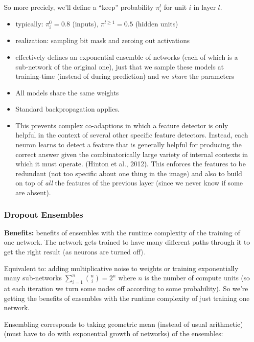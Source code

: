 \documentclass[a2paper,4pt]{extarticle}
\begin{document}
\begin{landscape}
\begin{multicols*}{7}
So more preciely, we'll define a ``keep'' probability $\pi_i^l$ for unit $i$ in
layer $l$.
\begin{itemize}
  \item typically: $\pi_i^0=0.8$ (inputs), $\pi^{l\geq 1}=0.5$ (hidden units)
  \item realization: sampling bit mask and zeroing out activations
  \item effectively defines an exponential ensemble of networks (each of which
  is a sub-network of the original one), just that we sample these models at
  training-time (instead of during prediction) and we \emph{share} the
  parameters
  \item All models share the same weights
  \item Standard backpropagation applies.
  \item This prevents complex co-adaptions in which a feature detector is only
helpful in the context of several other specific feature detectors. Instead,
each neuron learns to detect a feature that is generally helpful for producing
the correct answer given the combinatorically large variety of internal contexts
in which it must operate. (Hinton et al., 2012). This enforces the features to be redundant (not too specific about one thing in
the image) and also to build on top of \emph{all} the features of the previous
layer (since we never know if some are absent).
\end{itemize}

\subsubsection{Dropout Ensembles}

\textbf{Benefits:} benefits of ensembles with the runtime complexity of the
training of one network. The network gets trained to have many different paths through it to
get the right result (as neurons are turned off).

Equivalent to: adding multiplicative noise to weights or training exponentially
many sub-networks $\sum_{i=1}^{n}\binom{n}{i}=2^n$ where $n$ is the number of
compute units (so at each iteration we turn some nodes off according to some
probability). So we're getting the benefits of ensembles with the runtime
complexity of just training one network.

Ensembling corresponds to taking geometric mean (instead of usual arithmetic)
(must have to do with exponential growth of networks) of the ensembles:


\end{multicols*}
\end{landscape}
\end{document}
